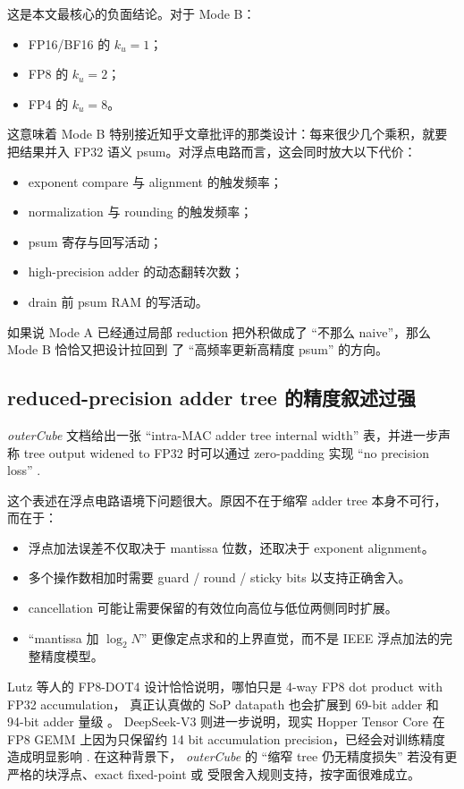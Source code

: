 \documentclass[UTF8,11pt,a4paper]{ctexart}
\newcommand{\ku}{\ensuremath{k_u}}
\newcommand{\modea}{Mode A}
\newcommand{\modeb}{Mode B}
\newcommand{\outercube}{\textit{outerCube}}
\begin{document}
这是本文最核心的负面结论。对于 \modeb{}：

\begin{itemize}
  \item FP16/BF16 的 $\ku = 1$；
  \item FP8 的 $\ku = 2$；
  \item FP4 的 $\ku = 8$。
\end{itemize}

这意味着 \modeb{} 特别接近知乎文章批评的那类设计：每来很少几个乘积，就要把结果并入 FP32
语义 psum。对浮点电路而言，这会同时放大以下代价：

\begin{itemize}
  \item exponent compare 与 alignment 的触发频率；
  \item normalization 与 rounding 的触发频率；
  \item psum 寄存与回写活动；
  \item high-precision adder 的动态翻转次数；
  \item drain 前 psum RAM 的写活动。
\end{itemize}

如果说 \modea{} 已经通过局部 reduction 把外积做成了 ``不那么 naive''，那么 \modeb{} 恰恰又把设计拉回到
了 ``高频率更新高精度 psum'' 的方向。

\subsection{reduced-precision adder tree 的精度叙述过强}

\outercube{} 文档给出一张 ``intra-MAC adder tree internal width'' 表，并进一步声称
tree output widened to FP32 时可以通过 zero-padding 实现 ``no precision loss'' \cite{outercube}.

这个表述在浮点电路语境下问题很大。原因不在于缩窄 adder tree 本身不可行，而在于：

\begin{itemize}
  \item 浮点加法误差不仅取决于 mantissa 位数，还取决于 exponent alignment。
  \item 多个操作数相加时需要 guard / round / sticky bits 以支持正确舍入。
  \item cancellation 可能让需要保留的有效位向高位与低位两侧同时扩展。
  \item ``mantissa 加 $\log_2 N$'' 更像定点求和的上界直觉，而不是 IEEE 浮点加法的完整精度模型。
\end{itemize}

Lutz 等人的 FP8-DOT4 设计恰恰说明，哪怕只是 4-way FP8 dot product with FP32 accumulation，
真正认真做的 SoP datapath 也会扩展到 69-bit adder 和 94-bit adder 量级 \cite{lutz2024}。
DeepSeek-V3 则进一步说明，现实 Hopper Tensor Core 在 FP8 GEMM 上因为只保留约 14 bit
accumulation precision，已经会对训练精度造成明显影响 \cite{deepseekv3}. 在这种背景下，
\outercube{} 的 ``缩窄 tree 仍无精度损失'' 若没有更严格的块浮点、exact fixed-point 或
受限舍入规则支持，按字面很难成立。
\end{document}

